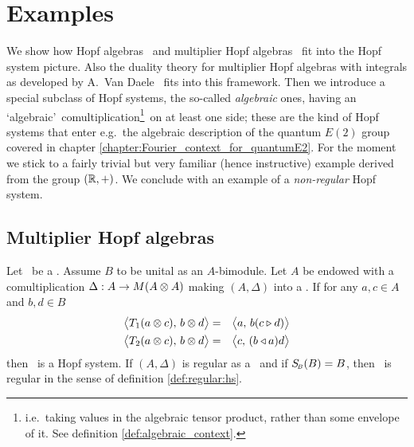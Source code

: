 \section{Examples}
\label{par:Examples}


\begin{abs_chp}
We show how Hopf algebras \cite{Schmudgen,Fons:DPHA}\
and multiplier Hopf algebras \cite{Fons:MHA}\ fit into the Hopf system picture.
Also the duality theory for multiplier Hopf algebras with integrals as developed
by A.\ Van Daele \cite{Fons:AFGD,Fons:AFGD:proc,Fons:pnas}\ fits into this framework.
Then we introduce a special subclass of Hopf systems, the so-called {\em algebraic\/} ones,
having an \lq algebraic\rq\ comultiplication\footnote{i.e.\ taking values in the
algebraic tensor product, rather than some envelope of it.
See definition \ref{def:algebraic_context}\@.}\
on at least one side; these are the kind of Hopf systems that enter e.g.\
the algebraic description of the quantum $E(2)$ group covered in chapter
\ref{chapter:Fourier_context_for_quantumE2}\@.
For the moment we stick to a fairly trivial but very familiar (hence instructive) example
derived from the group $(\mathbb{R},+)$.
We conclude with an example of a {\em non-regular\/} Hopf system.
\end{abs_chp}




\subsection{Multiplier Hopf algebras}

\begin{lemma}  \label{lem:mha:Hopf_system}
Let\/ \pairAB\ be a \dpa\@. Assume\/ $B$ to be unital as an $A$-bimodule.
Let $A$ be endowed with a comultiplication $\Delta : A \rightarrow M(A\otimes A)$
making\/ $(A,\Delta)$ into a \mha\@. If for any\/ $a,c \in A$ and\/ $b,d \in B$
\begin{eqnarray}
  \pairM{T_1(a \tens c)}{b\tens d}  &=&   \pairM{a}{b(c \lact d)}
       \label{eq:ex:mha:T1:mB}  \\
  \pairM{T_2(a \tens c)}{b\tens d}  &=&   \pairM{c}{(b \ract a)d}
       \label{eq:ex:mha:T2:mB}
\end{eqnarray}
then \pairAB\ is a Hopf system.
If\/ $(A,\Delta)$ is regular as a \mha\ and if\/ $S_{\scriptscriptstyle \! B}(B)=B$,
then\/ \pairAB\ is regular in the sense of definition \ref{def:regular:hs}\@.
\end{lemma}


